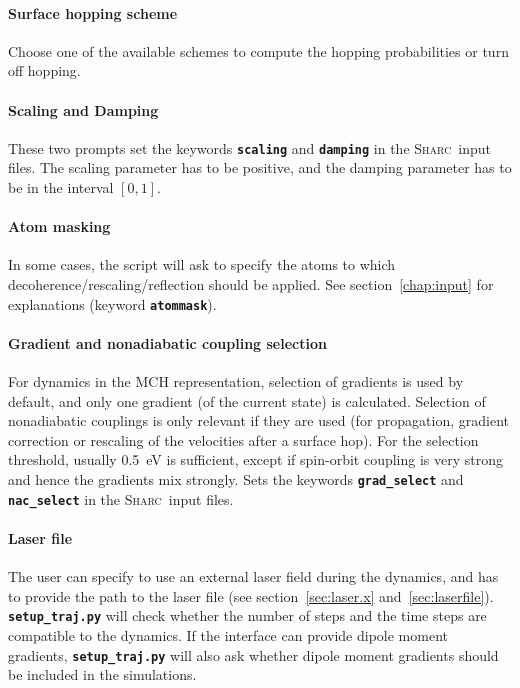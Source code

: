 \documentclass[a4paper,10pt,DIV=15,openany]{scrbook}
\newcommand{\sharc}{\textsc{Sharc}}
\newcommand{\ttt}[1]{\textbf{\texttt{#1}}}
\begin{document}
\paragraph{Surface hopping scheme}

Choose one of the available schemes to compute the hopping probabilities or turn off hopping.

\paragraph{Scaling and Damping}

These two prompts set the keywords \ttt{scaling} and \ttt{damping} in the \sharc\ input files. The scaling parameter has to be positive, and the damping parameter has to be in the interval $[0,1]$.

\paragraph{Atom masking}

In some cases, the script will ask to specify the atoms to which decoherence/rescaling/reflection should be applied.
See section~\ref{chap:input} for explanations (keyword \ttt{atommask}).

\paragraph{Gradient and nonadiabatic coupling selection}

For dynamics in the MCH representation, selection of gradients is used by default, and only one gradient (of the current state) is calculated. Selection of nonadiabatic couplings is only relevant if they are used (for propagation, gradient correction or rescaling of the velocities after a surface hop). For the selection threshold, usually 0.5~eV is sufficient, except if spin-orbit coupling is very strong and hence the gradients mix strongly.
Sets the keywords \ttt{grad\_select} and \ttt{nac\_select} in the \sharc\ input files.

\paragraph{Laser file}

The user can specify to use an external laser field during the dynamics, and has to provide the path to the laser file (see section~\ref{sec:laser.x} and~\ref{sec:laserfile}). \ttt{setup\_traj.py} will check whether the number of steps and the time steps are compatible to the dynamics. If the interface can provide dipole moment gradients, \ttt{setup\_traj.py} will also ask whether dipole moment gradients should be included in the simulations.
\end{document}
